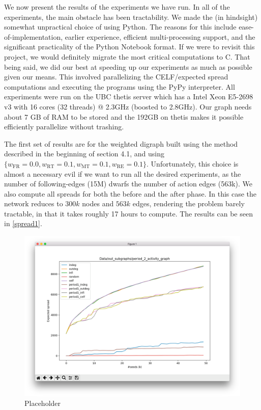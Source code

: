 \documentclass[sigconf]{acmart}
\begin{document}
We now present the results of the experiments we have run. In all of the experiments, the main obstacle has been tractability. We made the (in hindsight) somewhat unpractical choice of using Python. The reasons for this include ease-of-implementation, earlier experience, efficient multi-processing support, and the significant practicality of the Python Notebook format. If we were to revisit this project, we would definitely migrate the most critical computations to C. That being said, we did our best at speeding up our experiments as much as possible given our means. This involved parallelizing the CELF/expected spread computations and executing the programs using the PyPy interpreter. All experiments were run on the UBC thetis server which has a Intel Xeon E5-2698 v3 with 16 cores (32 threads) @ 2.3GHz (boosted to 2.8GHz). Our graph needs about 7 GB of RAM to be stored and the 192GB on thetis makes it possible efficiently parallelize without trashing.

The first set of results are for the weighted digraph built using the method described in the beginning of section 4.1, and using $\{w_{\text{FR}} = 0.0, w_{\text{RT}} = 0.1, w_{\text{MT}} = 0.1, w_{\text{RE}} = 0.1\}$. Unfortunately, this choice is almost a necessary evil if we want to run all the desired experiments, as the number of following-edges (15M) dwarfs the number of action edges (563k). We also compute all spreads for both the before and the after phase. In this case the network reduces to $300k$ nodes and $563k$ edges, rendering the problem barely tractable, in that it takes roughly 17 hours to compute. The results can be seen in \autoref{spread1}.

\begin{figure}[htbp]
\begin{center}
\includegraphics[width=0.9\linewidth]{Figures/spread1.png}
\caption{Placeholder}
\label{spread1}
\end{center}
\end{figure}
\end{document}
